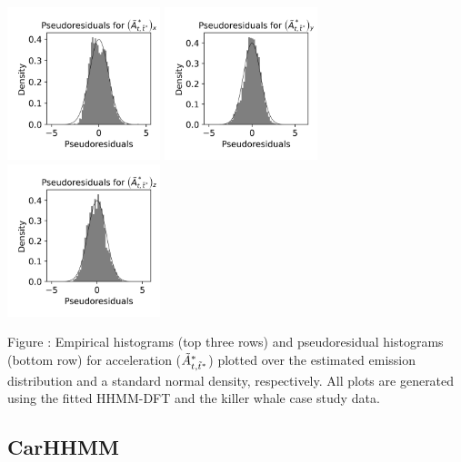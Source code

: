 \documentclass{article}
\begin{document}
\begin{center}
        \includegraphics[width=1.75in]{../Plots/2019/20190902-182840-CATs_OB_1_0_267_HHMM_pseudresids_Ax.png}
        \includegraphics[width=1.75in]{../Plots/2019/20190902-182840-CATs_OB_1_0_267_HHMM_pseudresids_Ay.png}
        \includegraphics[width=1.75in]{../Plots/2019/20190902-182840-CATs_OB_1_0_267_HHMM_pseudresids_Az.png}
        \end{center}
        
        \noindent Figure : Empirical histograms (top three rows) and pseudoresidual histograms (bottom row) for acceleration ($\tilde{A}^*_{t,\tilde t^*}$) plotted over the estimated emission distribution and a standard normal density, respectively. All plots are generated using the fitted HHMM-DFT and the killer whale case study data.
        \addtocounter{fignum}{1}
        
        \newpage
        
        \subsection{CarHHMM}
        
\end{document}
